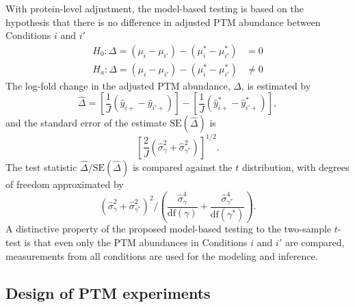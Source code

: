 \documentclass{mcp}
\begin{document}
With protein-level adjustment, the model-based testing is based on the hypothesis that there is no difference in adjusted PTM abundance between Conditions $i$ and $i'$
\begin{align*}
H_{0}: \Delta = \left( \mu_{i} - \mu_{i'} \right) - \left( \mu_{i}^{\ast} - \mu_{i'}^{\ast} \right) &= 0 \\
H_{a}: \Delta = \left( \mu_{i} - \mu_{i'} \right) - \left( \mu_{i}^{\ast} - \mu_{i'}^{\ast} \right) &\neq 0
\end{align*}
The log-fold change in the adjusted PTM abundance, $\Delta$, is estimated by 
\[
\hat{\Delta} = \left[ \frac{1}{J} \left( \hat{y}_{i+} - \hat{y}_{i'+} \right) \right] - \left[ \frac{1}{J} \left( \hat{y}_{i+}^{\ast} - \hat{y}_{i'+}^{\ast} \right) \right],
\]
and the standard error of the estimate $\mathrm{SE}(\hat{\Delta})$ is 
\[
\left[ \frac{2}{J} \left( \hat{\sigma}_{\gamma}^{2} + \hat{\sigma}_{\gamma^{\ast}}^{2} \right) \right]^{1/2}.
\]
The test statistic $\hat{\Delta} / \mathrm{SE}(\hat{\Delta})$ is compared against the $t$ distribution, with degrees of freedom approximated by
\[
\left( \hat{\sigma}_{\gamma}^{2} + \hat{\sigma}_{\gamma^{\ast}}^{2} \right)^2 \bigg/
\left( \frac{\hat{\sigma}_{\gamma}^{4}}{\mathrm{df}(\gamma)} + \frac{\hat{\sigma}_{\gamma^{\ast}}^{4}}{ \mathrm{df}(\gamma^{\ast})} \right).
\]
A distinctive property of the proposed model-based testing to the two-sample $t$-test is that even only the PTM abundances in Conditions $i$ and $i'$ are compared, measurements from all conditions are used for the modeling and inference. 


\subsection{Design of PTM experiments}
\label{sec:design}
\end{document}
